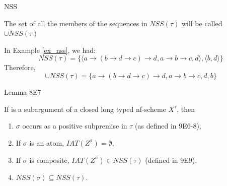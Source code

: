 \begin{frame}{NSS}
\begin{mydef}
The set of all the members of the sequences in $NSS(\tau)$ will be called $\cup NSS(\tau)$
\end{mydef}

\begin{exa}
In Example \ref{ex_nss}, we had: 
\begin{equation*}
    NSS(\tau) = \{ \langle a \rightarrow (b \rightarrow d \rightarrow c) \rightarrow d, a \rightarrow b \rightarrow c, d \rangle, \langle b, d \rangle \}
\end{equation*}
Therefore,
\begin{equation*}
    \cup NSS(\tau) = \{ a \rightarrow (b \rightarrow d \rightarrow c) \rightarrow d, a \rightarrow b \rightarrow c, d, b \}
\end{equation*}

\end{exa}

\end{frame}

\begin{frame}{Lemma 8E7}
\begin{lemma}[8E7 in Hindley's]
If  is a subargument of a closed long typed nf-scheme $X^\tau$, then 
\begin{enumerate}
    \item $\sigma$ occurs as a positive subpremise in $\tau$ (as defined in 9E6-8), 
    \item If $\sigma$ is an atom, $IAT(Z^\sigma) = \emptyset$, 
    \item If $\sigma$ is composite, $IAT(Z^\sigma) \in NSS(\tau)$ (defined in 9E9),
    \item $NSS(\sigma) \subseteq NSS(\tau)$.
\end{enumerate}
\end{lemma}
\end{frame}

